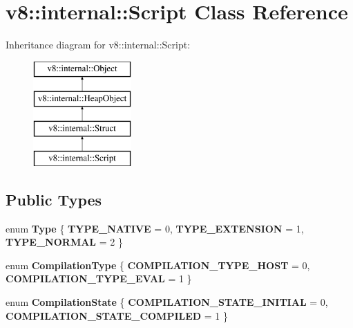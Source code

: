 \hypertarget{classv8_1_1internal_1_1_script}{}\section{v8\+:\+:internal\+:\+:Script Class Reference}
\label{classv8_1_1internal_1_1_script}
Inheritance diagram for v8\+:\+:internal\+:\+:Script\+:\begin{figure}[H]
\begin{center}
\leavevmode
\includegraphics[height=4.000000cm]{classv8_1_1internal_1_1_script}
\end{center}
\end{figure}
\subsection*{Public Types}
\begin{DoxyCompactItemize}
\item 
\hypertarget{classv8_1_1internal_1_1_script_ab293a016cf807eed21d94c4eb8b5d3a4}{}enum {\bfseries Type} \{ {\bfseries T\+Y\+P\+E\+\_\+\+N\+A\+T\+I\+V\+E} = 0, 
{\bfseries T\+Y\+P\+E\+\_\+\+E\+X\+T\+E\+N\+S\+I\+O\+N} = 1, 
{\bfseries T\+Y\+P\+E\+\_\+\+N\+O\+R\+M\+A\+L} = 2
 \}\label{classv8_1_1internal_1_1_script_ab293a016cf807eed21d94c4eb8b5d3a4}

\item 
\hypertarget{classv8_1_1internal_1_1_script_ad5ba2ef0105d489f8e29013ad262f584}{}enum {\bfseries Compilation\+Type} \{ {\bfseries C\+O\+M\+P\+I\+L\+A\+T\+I\+O\+N\+\_\+\+T\+Y\+P\+E\+\_\+\+H\+O\+S\+T} = 0, 
{\bfseries C\+O\+M\+P\+I\+L\+A\+T\+I\+O\+N\+\_\+\+T\+Y\+P\+E\+\_\+\+E\+V\+A\+L} = 1
 \}\label{classv8_1_1internal_1_1_script_ad5ba2ef0105d489f8e29013ad262f584}

\item 
\hypertarget{classv8_1_1internal_1_1_script_a365b68632fc01a8bbae09764f6a0c2d5}{}enum {\bfseries Compilation\+State} \{ {\bfseries C\+O\+M\+P\+I\+L\+A\+T\+I\+O\+N\+\_\+\+S\+T\+A\+T\+E\+\_\+\+I\+N\+I\+T\+I\+A\+L} = 0, 
{\bfseries C\+O\+M\+P\+I\+L\+A\+T\+I\+O\+N\+\_\+\+S\+T\+A\+T\+E\+\_\+\+C\+O\+M\+P\+I\+L\+E\+D} = 1
 \}\label{classv8_1_1internal_1_1_script_a365b68632fc01a8bbae09764f6a0c2d5}

\end{DoxyCompactItemize}
